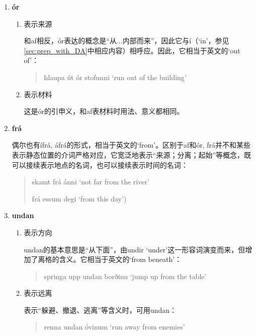 \begin{enumerate}[itemindent=1em, label=\textbf{\arabic*}.]
    \item \textbf{ór}
          \begin{enumerate}
              \item 表示来源

                    和af相反，ór表达的概念是“从...内部而来”，因此它与í（`in'，参见\ref{sec:prep_with_DA}中相应内容）相呼应。因此，它相当于英文的`out of'：
                    \begin{quote}
                        hlaupa út ór stofunni `run out of the building'
                    \end{quote}

              \item 表示材料

                    这是ór的引申义，和af表材料时用法、意义都相同。
          \end{enumerate}

    \item \textbf{frá}

          偶尔也有ífrá, áfrá的形式，相当于英文的`from'。区别于af和ór, frá并不和某些表示静态位置的介词严格对应，它宽泛地表示“来源；分离；起始”等概念，既可以接续表示地点的名词，也可以接续表示时间的名词：
          \begin{quote}
              skamt frá ánni `not far from the river'

              frá \th essum degi `from this day')
          \end{quote}

    \item \textbf{undan}
          \begin{enumerate}
              \item 表示方向

                    undan的基本意思是“从下面”，由undir `under'这一形容词演变而来，但增加了离格的含义。它相当于英文的`from beneath'：
                    \begin{quote}
                        springa upp undan borðinu `jump up from the table'
                    \end{quote}

              \item 表示远离

                    表示“躲避、撤退、逃离”等含义时，可用undan：
                    \begin{quote}
                        renna undan óvinum `run away from enemies'
                    \end{quote}
          \end{enumerate}


\end{enumerate}
